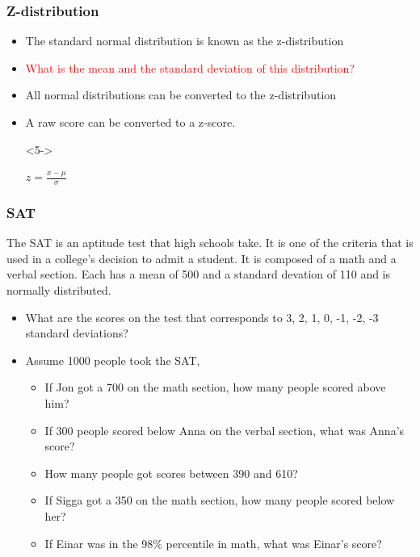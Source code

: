 \documentclass[dvipsnames]{beamer}\usepackage[]{graphicx}\usepackage[]{color}
\begin{document}
\begin{frame}
\frametitle{Z-distribution}

\begin{itemize}
  \item<1-> The standard normal distribution is known as the z-distribution
  \item<2-> \textcolor{red}{What is the mean and the standard deviation of this distribution?}
  \item<3-> All normal distributions can be converted to the z-distribution
  \item<4-> A raw score can be converted to a z-score.
  \item[]<5-> \begin{center}$z = \frac{x - \mu}{\sigma}$\end{center}
\end{itemize}
\end{frame}

\begin{frame}
  \frametitle{SAT}
  
  The SAT is an aptitude test that high schools take. It is one of the criteria that is used in a college's decision to admit a student. It is composed of a math and a verbal section. Each has a mean of 500 and a standard devation of 110 and is normally distributed. 
  \begin{itemize}
  \item<1-> What are the scores on the test that corresponds to 3, 2, 1, 0, -1, -2, -3 standard deviations?
  \item<2-> Assume 1000 people took the SAT,
  \begin{itemize}
    \item<3-> If Jon got a 700 on the math section, how many people scored above him?
    \item<4-> If 300 people scored below Anna on the verbal section, what was Anna's score?
    \item<5-> How many people got scores between 390 and 610?
    \item<6-> If Sigga got a 350 on the math section, how many people scored below her?
    \item<7-> If Einar was in the 98\% percentile in math, what was Einar's score?
  \end{itemize}
  \end{itemize}
\end{frame}
\end{document}

